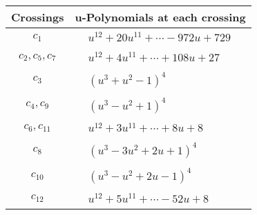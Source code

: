 \documentclass[1p]{elsarticle_modified}
\theoremstyle{definition}
\begin{document}
\begin{tabular}{m{50pt}|m{274pt}}
Crossings & \hspace{64pt}u-Polynomials at each crossing \\
\hline $$\begin{aligned}c_{1}\end{aligned}$$&$\begin{aligned}
&u^{12}+20 u^{11}+\cdots-972 u+729
\end{aligned}$\\
\hline $$\begin{aligned}c_{2},c_{5},c_{7}\end{aligned}$$&$\begin{aligned}
&u^{12}+4 u^{11}+\cdots+108 u+27
\end{aligned}$\\
\hline $$\begin{aligned}c_{3}\end{aligned}$$&$\begin{aligned}
&(u^3+u^2-1)^4
\end{aligned}$\\
\hline $$\begin{aligned}c_{4},c_{9}\end{aligned}$$&$\begin{aligned}
&(u^3- u^2+1)^4
\end{aligned}$\\
\hline $$\begin{aligned}c_{6},c_{11}\end{aligned}$$&$\begin{aligned}
&u^{12}+3 u^{11}+\cdots+8 u+8
\end{aligned}$\\
\hline $$\begin{aligned}c_{8}\end{aligned}$$&$\begin{aligned}
&(u^3-3 u^2+2 u+1)^4
\end{aligned}$\\
\hline $$\begin{aligned}c_{10}\end{aligned}$$&$\begin{aligned}
&(u^3- u^2+2 u-1)^4
\end{aligned}$\\
\hline $$\begin{aligned}c_{12}\end{aligned}$$&$\begin{aligned}
&u^{12}+5 u^{11}+\cdots-52 u+8
\end{aligned}$\\
\hline
\end{tabular}\\~\\
\end{document}
